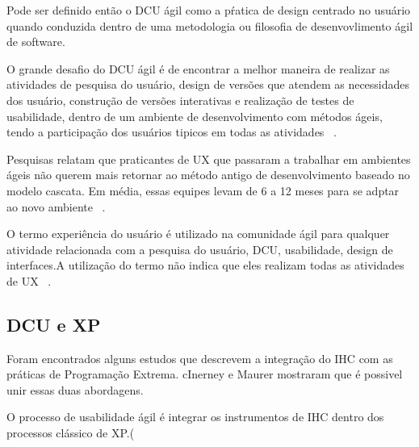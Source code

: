 	Pode ser definido então o DCU ágil como a pŕatica de design centrado no usuário quando conduzida dentro de uma metodologia ou filosofia de desenvovlimento ágil de software.~\cite{santos2012}

	O grande desafio do DCU ágil é de encontrar a melhor maneira de realizar as atividades de pesquisa do usuário, design de versões que atendem as necessidades dos usuário, construção de versões interativas e realização de testes de usabilidade, dentro de um ambiente de desenvolvimento com métodos ágeis, tendo a participação dos usuários tipicos em todas as atividades ~\cite{santos2012}.%

	Pesquisas relatam que praticantes de UX que passaram a trabalhar em ambientes ágeis não querem mais retornar ao método antigo de desenvolvimento baseado no modelo cascata. Em média, essas equipes levam de 6 a 12 meses para se adptar ao novo ambiente ~\cite{santos2012}.

	O termo experiência do usuário é utilizado na comunidade ágil para qualquer atividade relacionada com a pesquisa do usuário, DCU, usabilidade, design de interfaces.A utilização do termo não indica que eles realizam todas as atividades de UX ~\cite{santos2012}.


\subsection {DCU e XP}

Foram encontrados alguns estudos que descrevem a integração do IHC com as práticas de Programação Extrema. cInerney e Maurer mostraram que é possivel unir essas duas abordagens.

O processo de usabilidade ágil é integrar os instrumentos de IHC dentro dos processos clássico de XP.(


